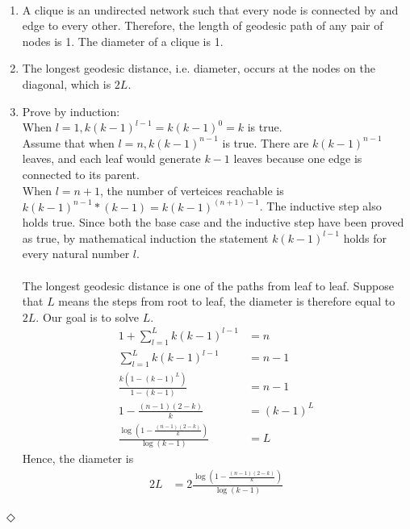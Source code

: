 \documentclass[12pt]{article}
\newcommand {\bsolution}{\noindent {\em Solution:} \ }
\newcommand{\esolution}{\hfill $\Diamond$ \\ \vspace{.3cm}}
\begin{document}
\bsolution
\begin{enumerate}[label=(\alph*)]
	\item  A clique is an undirected network such that every node is connected by and edge to every other. Therefore, the length of geodesic path of any pair of nodes is 1. The diameter of a clique is 1.
	\item The longest geodesic distance, i.e. diameter, occurs at the nodes on the diagonal, which is $2L$.
	\item Prove by induction: \\
			When $l=1, k(k-1)^{l-1}=k(k-1)^0=k$ is true. \\
			Assume that when $l=n, k(k-1)^{n-1}$ is true. There are $k(k-1)^{n-1}$ leaves, and each leaf would generate $k-1$ leaves because one edge is connected to its parent. \\
			When $l=n+1$, the number of verteices reachable is $k(k-1)^{n-1}*(k-1)=k(k-1)^{(n+1)-1}$. The inductive step also holds true. Since both the base case and the inductive step have been proved as true, by mathematical induction the statement $k(k-1)^{l-1}$ holds for every natural number $l$. \\\\
		The longest geodesic distance is one of the paths from leaf to leaf. Suppose that $L$ means the steps from root to leaf, the diameter is therefore equal to $2L$. Our goal is to solve $L$.\\
		\begin{align*}
			1+\sum_{l=1}^{L}{k(k-1)^{l-1}} &= n \\
			\sum_{l=1}^{L}{k(k-1)^{l-1}} &= n-1 \\
			\frac{k(1-(k-1)^L)}{1-(k-1)} &= n-1 \\
			1-\frac{(n-1)(2-k)}{k} &= (k-1)^L \\
			\frac{\log{(1-\frac{(n-1)(2-k)}{k})}}{\log{(k-1)}} &= L
		\end{align*}
		Hence, the diameter is
		\begin{align*}
			2L &= 2\frac{\log{(1-\frac{(n-1)(2-k)}{k})}}{\log{(k-1)}}
		\end{align*}
\end{enumerate}
\esolution

\newpage
\end{document}
